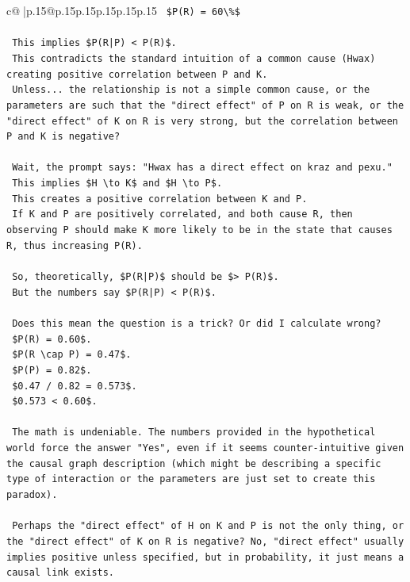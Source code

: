 \documentclass{article}
\begin{document}
{\begin{supertabular}{c@{$\;$}|p{.15\linewidth}@{}p{.15\linewidth}p{.15\linewidth}p{.15\linewidth}p{.15\linewidth}p{.15\linewidth}}
{{{\texttt{    \$P(R) = 60\textbackslash{}\%\$} \\
\\ 
\texttt{    This implies \$P(R|P) < P(R)\$.} \\
\texttt{    This contradicts the standard intuition of a common cause (Hwax) creating positive correlation between P and K.} \\
\texttt{    Unless... the relationship is not a simple common cause, or the parameters are such that the "direct effect" of P on R is weak, or the "direct effect" of K on R is very strong, but the correlation between P and K is negative?} \\
\\ 
\texttt{    Wait, the prompt says: "Hwax has a direct effect on kraz and pexu."} \\
\texttt{    This implies \$H \textbackslash{}to K\$ and \$H \textbackslash{}to P\$.} \\
\texttt{    This creates a positive correlation between K and P.} \\
\texttt{    If K and P are positively correlated, and both cause R, then observing P should make K more likely to be in the state that causes R, thus increasing P(R).} \\
\\ 
\texttt{    So, theoretically, \$P(R|P)\$ should be \$> P(R)\$.} \\
\texttt{    But the numbers say \$P(R|P) < P(R)\$.} \\
\\ 
\texttt{    Does this mean the question is a trick? Or did I calculate wrong?} \\
\texttt{    \$P(R) = 0.60\$.} \\
\texttt{    \$P(R \textbackslash{}cap P) = 0.47\$.} \\
\texttt{    \$P(P) = 0.82\$.} \\
\texttt{    \$0.47 / 0.82 = 0.573\$.} \\
\texttt{    \$0.573 < 0.60\$.} \\
\\ 
\texttt{    The math is undeniable. The numbers provided in the hypothetical world force the answer "Yes", even if it seems counter{-}intuitive given the causal graph description (which might be describing a specific type of interaction or the parameters are just set to create this paradox).} \\
\\ 
\texttt{    Perhaps the "direct effect" of H on K and P is not the only thing, or the "direct effect" of K on R is negative? No, "direct effect" usually implies positive unless specified, but in probability, it just means a causal link exists.} \\
}}}
\end{supertabular}}
\end{document}
